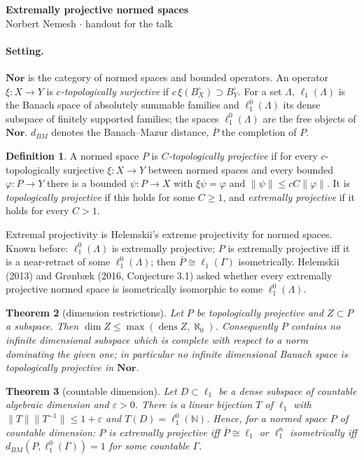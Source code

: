 \documentclass[11pt]{article}
\newtheorem{theorem}{Theorem}
\theoremstyle{definition}
\newtheorem{definition}[theorem]{Definition}
\newcommand{\Nor}{\mathbf{Nor}}
\newcommand{\lo}[1]{\ell_1^0(#1)}
\newcommand{\ellone}[1]{\ell_1(#1)}
\newcommand{\norm}[1]{\lVert #1\rVert}
\newcommand{\BM}{d_{BM}}
\begin{document}
\begin{center}
  {\large\bfseries Extremally projective normed spaces}\\[2pt]
  Norbert Nemesh \quad $\cdot$ \quad handout for the talk
\end{center}

\paragraph{Setting.} $\Nor$ is the category of normed spaces and bounded
operators. An operator $\xi\colon X\to Y$ is \emph{$c$-topologically
surjective} if $c\,\xi(B_X^\circ)\supset B_Y^\circ$. For a set $\Lambda$,
$\ellone\Lambda$ is the Banach space of absolutely summable families and
$\lo\Lambda$ its dense subspace of finitely supported families; the spaces
$\lo\Lambda$ are the free objects of $\Nor$. $\BM$ denotes the Banach--Mazur
distance, $\overline P$ the completion of $P$.

\begin{definition}
A normed space $P$ is \emph{$C$-topologically projective} if for every
$c$-topologically surjective $\xi\colon X\to Y$ between normed spaces and every
bounded $\varphi\colon P\to Y$ there is a bounded $\psi\colon P\to X$ with
$\xi\psi=\varphi$ and $\norm\psi\le cC\norm\varphi$. It is \emph{topologically
projective} if this holds for some $C\ge1$, and \emph{extremally projective}
if it holds for every $C>1$.
\end{definition}

Extremal projectivity is Helemskii's extreme projectivity for normed spaces.
Known before: $\lo\Lambda$ is extremally projective; $P$ is extremally
projective iff it is a near-retract of some $\lo\Lambda$; then
$\overline P\cong\ellone\Gamma$ isometrically. Helemskii (2013) and
Gr{\o}nb{\ae}k (2016, Conjecture 3.1) asked whether every extremally
projective normed space is isometrically isomorphic to some $\lo\Lambda$.

\begin{theorem}[dimension restrictions]
Let $P$ be topologically projective and $Z\subset P$ a subspace. Then
$\dim Z\le\max(\operatorname{dens}Z,\aleph_0)$. Consequently $P$ contains no
infinite dimensional subspace which is complete with respect to a norm
dominating the given one; in particular no infinite dimensional Banach space
is topologically projective in $\Nor$.
\end{theorem}

\begin{theorem}[countable dimension]
Let $D\subset\ell_1$ be a dense subspace of countable algebraic dimension and
$\varepsilon>0$. There is a linear bijection $T$ of $\ell_1$ with
$\norm T\norm{T^{-1}}\le1+\varepsilon$ and $T(D)=\lo{\mathbb N}$. Hence, for a
normed space $P$ of countable dimension: $P$ is extremally projective iff
$\overline P\cong\ell_1$ or $\ell_1^n$ isometrically iff $\BM(P,\lo\Gamma)=1$
for some countable $\Gamma$.
\end{theorem}
\end{document}
